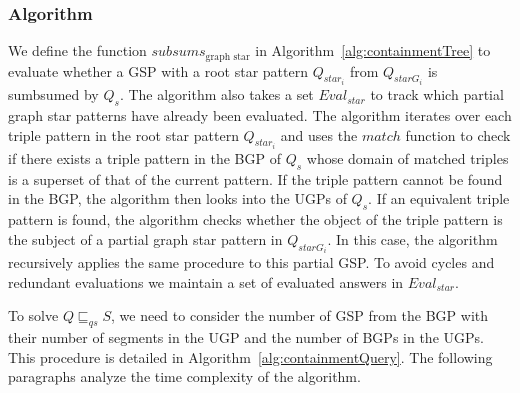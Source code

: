 \subsubsection{Algorithm}



We define the function $subsums_{\text{graph star}}$ in Algorithm~\ref{alg:containmentTree} to evaluate whether a GSP with a root star pattern $Q_{star_i}$ from $Q_{starG_i}$ is sumbsumed by $Q_s$. 
The algorithm also takes a set $Eval_{star}$ to track which partial graph star patterns have already been evaluated.
The algorithm iterates over each triple pattern in the root star pattern $Q_{star_i}$ and uses the $match$ function to check if there exists a triple pattern in the BGP of $Q_s$ whose domain of matched triples is a superset of that of the current pattern.
If the triple pattern cannot be found in the BGP, the algorithm then looks into the UGPs of $Q_s$. 
If an equivalent triple pattern is found, the algorithm checks whether the object of the triple pattern is the subject of a partial graph star pattern in $Q_{starG_i}$.
In this case, the algorithm recursively applies the same procedure to this partial GSP.
To avoid cycles and redundant evaluations we maintain a set of evaluated answers in $Eval_{star}$.

To solve $Q \sqsubseteq_{qs} S$, we need to consider the number of GSP from the BGP with their number of segments in the UGP and the number of BGPs in the UGPs.
This procedure is detailed in Algorithm~\ref{alg:containmentQuery}.
The following paragraphs analyze the time complexity of the algorithm.

